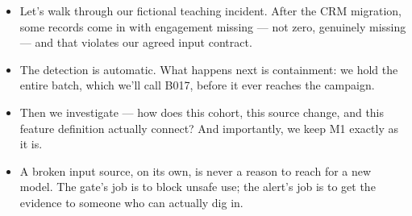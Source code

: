 \documentclass[11pt,a4paper]{article}
\begin{document}
\begin{examplebox}[title after break={SPOKEN SCRIPT --- slide 24 continued}]
\begin{itemize}
\item Let's walk through our fictional teaching incident. After the CRM migration, some records come in with engagement missing — not zero, genuinely missing — and that violates our agreed input contract.
\item The detection is automatic. What happens next is containment: we hold the entire batch, which we'll call B017, before it ever reaches the campaign.
\item Then we investigate — how does this cohort, this source change, and this feature definition actually connect? And importantly, we keep M1 exactly as it is.
\item A broken input source, on its own, is never a reason to reach for a new model. The gate's job is to block unsafe use; the alert's job is to get the evidence to someone who can actually dig in.
\end{itemize}
\end{examplebox}
\par\noindent{\scriptsize\textcolor{teal!60!black}{Reading anchor: Bass, Ch. 11 / §14.1.5 · Fictional B017 incident}}
\clearpage
\end{document}
